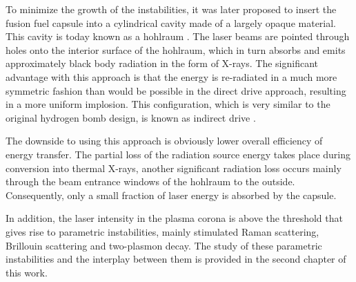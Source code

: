 To minimize the growth of the instabilities, it was later proposed to insert the fusion fuel capsule into a cylindrical cavity made of a largely opaque material. This cavity is today known as a hohlraum \cite{murakami}. The laser beams are pointed through holes onto the interior surface of the hohlraum, which in turn absorbs and emits approximately black body radiation in the form of X-rays. The significant advantage with this approach is that the energy is re-radiated in a much more symmetric fashion than would be possible in the direct drive approach, resulting in a more uniform implosion. This configuration, which is very similar to the original hydrogen bomb design, is known as indirect drive \cite{atzeni}.

The downside to using this approach is obviously lower overall efficiency of energy transfer. The partial loss of the radiation source energy takes place during conversion into thermal X-rays, another significant radiation loss occurs mainly through the beam entrance windows of the hohlraum to the outside. Consequently, only a small fraction of laser energy is absorbed by the capsule. 

In addition, the laser intensity in the plasma corona is above the threshold that gives rise to parametric instabilities, mainly stimulated Raman scattering, Brillouin scattering and two-plasmon decay. The study of these parametric instabilities and the interplay between them is provided in the second chapter of this work.